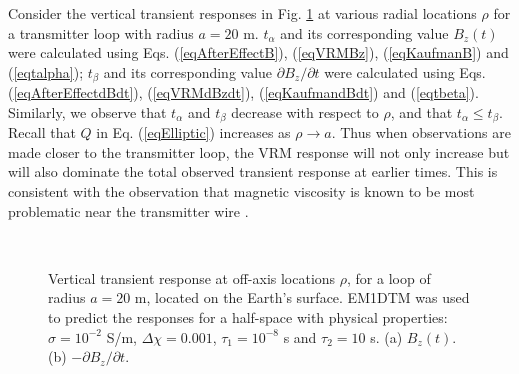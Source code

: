 \documentclass[onecolumn]{IEEEtran} %
\begin{document}
Consider the vertical transient responses in Fig.
\ref{figEMandVRMrespOffAxis} at various radial locations $\rho$ for
a transmitter loop with radius $a=20$ m. $t_{\alpha}$ and its
corresponding value $B_z(t)$ were calculated using Eqs.
(\ref{eqAfterEffectB}), (\ref{eqVRMBz}), (\ref{eqKaufmanB}) and
(\ref{eqtalpha}); $t_{\beta}$ and its corresponding value $\partial
B_z/\partial t$ were calculated using Eqs.
(\ref{eqAfterEffectdBdt}), (\ref{eqVRMdBzdt}), (\ref{eqKaufmandBdt})
and (\ref{eqtbeta}). Similarly, we observe that $t_\alpha$ and
$t_\beta$ decrease with respect to $\rho$, and that $t_\alpha \leq
t_\beta$. Recall that $Q$ in Eq. (\ref{eqElliptic})
increases as $\rho \rightarrow a$. Thus when observations are made closer
to the transmitter loop, the VRM response will not only increase but will
also dominate the total observed transient response at earlier
times. This is consistent with the observation that magnetic
viscosity is known to be most problematic near the transmitter wire
\cite{Buselli1982,Lee1984,Barsukov2001}.

%
\begin{figure}[!t]
    \centering
    \\
    \vspace{-10pt}
    \caption{Vertical transient response at off-axis locations $\rho$,
    for a loop of radius $a=20$ m, located on the Earth's surface.
    EM1DTM was used to predict the responses for a half-space with
    physical properties: $\sigma=10^{-2}$ S/m, $\Delta \chi=0.001$, $\tau_1=10^{-8}$ s and $\tau_2=10$ s. (a) $B_z (t)$. (b) $-\partial B_z/\partial t$.}
    \label{figEMandVRMrespOffAxis}
\end{figure}
%
\end{document}
